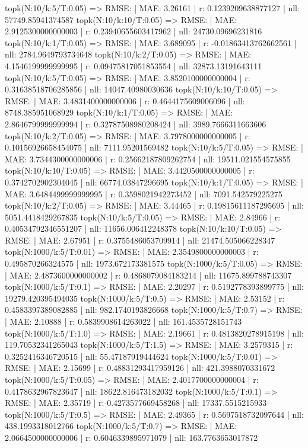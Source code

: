 topk(N:10/k:5/T:0.05) => RMSE: | MAE: 3.26161 | r: 0.1239209638877127 | nll: 57749.85941374587
topk(N:10/k:10/T:0.05) => RMSE: | MAE: 2.9125300000000003 | r: 0.23940655603417962 | nll: 24730.09696231816
topk(N:10/k:1/T:0.05) => RMSE: | MAE: 3.689095 | r: -0.01863413762662561 | nll: 2784.9649793734648
topk(N:10/k:2/T:0.05) => RMSE: | MAE: 4.1546199999999995 | r: 0.09475817051853554 | nll: 32873.13191643111
topk(N:10/k:5/T:0.05) => RMSE: | MAE: 3.8520100000000004 | r: 0.31638518706285856 | nll: 14047.40980030636
topk(N:10/k:10/T:0.05) => RMSE: | MAE: 3.4831400000000006 | r: 0.4644175609006096 | nll: 8748.385951068929
topk(N:10/k:1/T:0.05) => RMSE: | MAE: 2.8646799999999994 | r: 0.32787508980208424 | nll: 3989.7666311663606
topk(N:10/k:2/T:0.05) => RMSE: | MAE: 3.7978000000000005 | r: 0.10156926658454075 | nll: 7111.95201569482
topk(N:10/k:5/T:0.05) => RMSE: | MAE: 3.7344300000000006 | r: 0.25662187809262754 | nll: 19511.021554575855
topk(N:10/k:10/T:0.05) => RMSE: | MAE: 3.4420500000000005 | r: 0.3742702902304045 | nll: 66774.03847296695
topk(N:10/k:1/T:0.05) => RMSE: | MAE: 3.6484499999999995 | r: 0.3598021942273452 | nll: 7091.542579225275
topk(N:10/k:2/T:0.05) => RMSE: | MAE: 3.44465 | r: 0.19815611187295695 | nll: 5051.4418429267835
topk(N:10/k:5/T:0.05) => RMSE: | MAE: 2.84966 | r: 0.40534792346551207 | nll: 11656.006412248378
topk(N:10/k:10/T:0.05) => RMSE: | MAE: 2.67951 | r: 0.3755486053709914 | nll: 21474.505066228347
topk(N:1000/k:5/T:0.01) => RMSE: | MAE: 2.3549800000000003 | r: 0.495870266324575 | nll: 1973.672173381575
topk(N:1000/k:5/T:0.05) => RMSE: | MAE: 2.4873600000000002 | r: 0.4868079084183214 | nll: 11675.899788743307
topk(N:1000/k:5/T:0.1) => RMSE: | MAE: 2.20297 | r: 0.5192778393899775 | nll: 19279.420395494035
topk(N:1000/k:5/T:0.5) => RMSE: | MAE: 2.53152 | r: 0.4583397389082885 | nll: 982.1740193826668
topk(N:1000/k:5/T:0.7) => RMSE: | MAE: 2.10888 | r: 0.5839908614263022 | nll: 161.4535728151743
topk(N:1000/k:5/T:1.0) => RMSE: | MAE: 2.19661 | r: 0.4813820278915198 | nll: 119.70532341265043
topk(N:1000/k:5/T:1.5) => RMSE: | MAE: 3.2579315 | r: 0.3252416346720515 | nll: 55.47187919444624
topk(N:1000/k:5/T:0.01) => RMSE: | MAE: 2.15699 | r: 0.48831293417959126 | nll: 421.3988070331672
topk(N:1000/k:5/T:0.05) => RMSE: | MAE: 2.4017700000000004 | r: 0.4178632967823647 | nll: 18622.816473182032
topk(N:1000/k:5/T:0.1) => RMSE: | MAE: 2.35719 | r: 0.4273577669458268 | nll: 17337.5515215933
topk(N:1000/k:5/T:0.5) => RMSE: | MAE: 2.49365 | r: 0.5697518732097644 | nll: 438.1993318012766
topk(N:1000/k:5/T:0.7) => RMSE: | MAE: 2.0664500000000006 | r: 0.6046339895971079 | nll: 163.7763653017872
